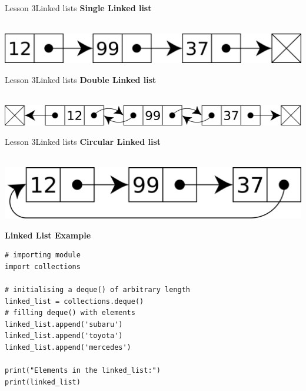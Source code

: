 \documentclass[aspectratio=1610]{beamer}
\begin{document}
\begin{frame}{Lesson 3}{Linked lists}
\LARGE
\textbf{Single Linked list}\\~\\
\begin{center}
\includegraphics[scale=0.12]{Images/linked-list}
\end{center}
\end{frame}


\begin{frame}{Lesson 3}{Linked lists}
\LARGE
\textbf{Double Linked list}\\~\\
\begin{center}
\includegraphics[scale=0.13]{Images/double-linked-list}
\end{center}
\end{frame}


\begin{frame}{Lesson 3}{Linked lists}
\LARGE
\textbf{Circular Linked list}\\~\\
\begin{center}
\includegraphics[scale=0.11]{Images/circular-linked-list}
\end{center}
\end{frame}



\begin{frame}[fragile]
\Large
\textbf{Linked List Example}\\
\begin{lstlisting}
# importing module 
import collections 

# initialising a deque() of arbitrary length 
linked_list = collections.deque()
# filling deque() with elements 
linked_list.append('subaru') 
linked_list.append('toyota') 
linked_list.append('mercedes') 
  
print("Elements in the linked_list:") 
print(linked_list)
\end{lstlisting}
\end{frame}
\end{document}
